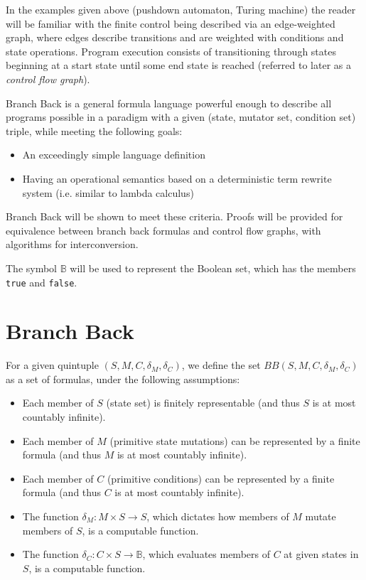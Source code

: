 \documentclass[11pt]{article}
\begin{document}
In the examples given above (pushdown automaton, Turing machine) the reader will be familiar with the finite control being described via an edge-weighted graph, where edges describe transitions and are weighted with conditions and state operations.  Program execution consists of transitioning through states beginning at a start state until some end state is reached (referred to later as a \emph{control flow graph}).

Branch Back is a general formula language powerful enough to describe all programs possible in a paradigm with a given (state, mutator set, condition set) triple, while meeting the following goals:

\begin{itemize}
\item An exceedingly simple language definition
\item Having an operational semantics based on a deterministic term rewrite system (i.e. similar to lambda calculus)
\end{itemize}

Branch Back will be shown to meet these criteria.  Proofs will be provided for equivalence between branch back formulas and control flow graphs, with algorithms for interconversion.

The symbol $\mathbb{B}$ will be used to represent the Boolean set, which has the members \texttt{true} and \texttt{false}.

\section{Branch Back}
For a given quintuple $(S, M, C, \delta_{M}, \delta_{C})$, we define the set $BB(S, M, C, \delta_{M}, \delta_{C})$ as a set of formulas, under the following assumptions:

\begin{itemize}
\item Each member of $S$ (state set) is finitely representable (and thus $S$ is at most countably infinite).
\item Each member of $M$ (primitive state mutations) can be represented by a finite formula (and thus $M$ is at most countably infinite).
\item Each member of $C$ (primitive conditions) can be represented by a finite formula (and thus $C$ is at most countably infinite).
\item The function $\delta_{M} : M \times S \rightarrow S$, which dictates how members of $M$ mutate members of $S$, is a computable function. 
\item The function $\delta_{C} : C \times S \rightarrow \mathbb{B}$, which evaluates members of $C$ at given states in $S$, is a computable function.
\end{itemize}
\end{document}
